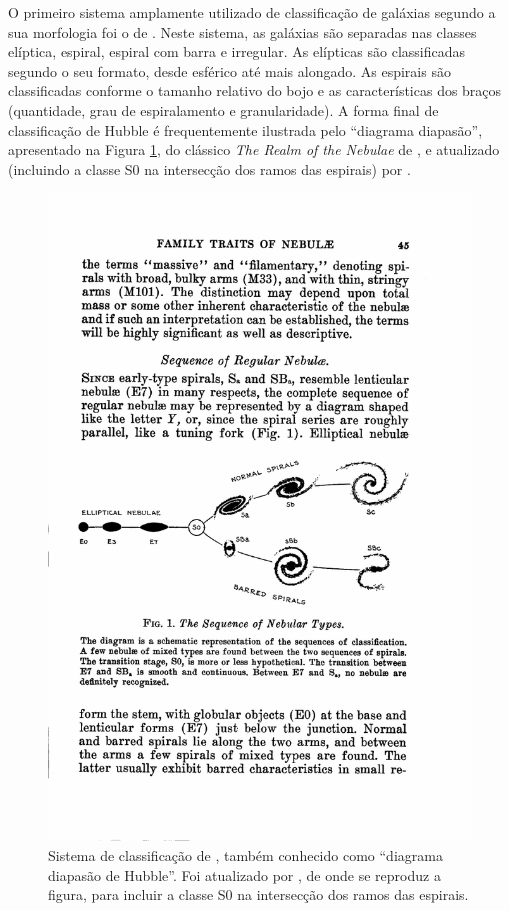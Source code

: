 O primeiro sistema amplamente utilizado de classificação de galáxias segundo a
sua morfologia foi o de \citet{Hubble1926}. Neste sistema, as galáxias são
separadas nas classes elíptica, espiral, espiral com barra e irregular. As
elípticas são classificadas segundo o seu formato, desde esférico até mais
alongado. As espirais são classificadas conforme o tamanho relativo do bojo e as
características dos braços (quantidade, grau de espiralamento e granularidade).
A forma final de classificação de Hubble é frequentemente ilustrada pelo
``diagrama diapasão'', apresentado na Figura \ref{fig:HubbleSequence}, do
clássico {\em The Realm of the Nebulae} de \citet{hubble1936}, e atualizado
(incluindo a classe S0 na intersecção dos ramos das espirais) por
\citet{Sandage1975}.

\begin{figure}
	\includegraphics[width=1.0\textwidth]{figuras/HubbleSequence}
	\caption[Classificação de Hubble]
	{Sistema de classificação de \citet{hubble1936}, também conhecido como
	``diagrama diapasão de Hubble''. Foi atualizado por
	\citet{Sandage1975}, de onde se reproduz a figura, para incluir a classe S0 na
	intersecção dos ramos das espirais.}
	\label{fig:HubbleSequence}
\end{figure}


